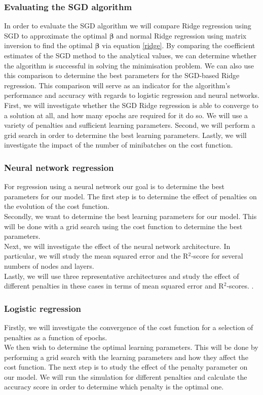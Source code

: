 \documentclass[notitlepage, reprint, nofootinbib]{revtex4-1}
\begin{document}
\subsubsection{Evaluating the SGD algorithm}
In order to evaluate the SGD algorithm we will compare Ridge regression using SGD to approximate the optimal $\boldsymbol{\beta}$ and normal Ridge regression using matrix inversion to find the optimal $\boldsymbol{\beta}$ via equation \ref{ridge}. By comparing the coefficient estimates of the SGD method to the analytical values, we can determine whether the algorithm is successful in solving the minimisation problem. We can also use this comparison to determine the best parameters for the SGD-based Ridge regression.  This comparison will serve as an indicator for the algorithm's performance and accuracy with regards to logistic regression and neural networks. \\[2mm]
First, we will investigate whether the SGD Ridge regression is able to converge to a solution at all, and how many epochs are required for it do so. We will use a variety of penalties and sufficient learning parameters. Second, we will perform a grid search in order to determine the best learning parameters. Lastly, we will investigate the impact of the number of minibatches on the cost function.

\subsubsection{Neural network regression}
For regression using a neural network our goal is to determine the best parameters for our model. The first step is to determine the effect of penalties on the evolution of the cost function. \\[2mm]
Secondly, we want to determine the best learning parameters for our model. This will be done with a grid search using the cost function to determine the best parameters. \\[2mm]
Next, we will investigate the effect of the neural network architecture. In particular, we will study the mean squared error and the R$^2$-score for several numbers of nodes and layers. \\[2mm]
Lastly, we will use three representative architectures and study the effect of different penalties in these cases in terms of mean squared error and R$^2$-scores. . 

\newpage
\subsubsection{Logistic regression}
Firstly, we will investigate the convergence of the cost function for a selection of penalties as a function of epochs. \\[2mm]
We then wish to determine the optimal learning parameters. This will be done by performing a grid search with the learning parameters and how they affect the cost function. The next step is to study the effect of the penalty parameter on our model. We will run the simulation for different penalties and calculate the accuracy score in order to determine which penalty is the optimal one. 
\end{document}
